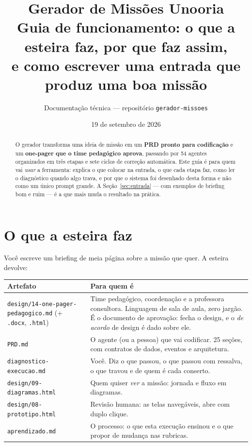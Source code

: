 \documentclass[11pt,a4paper]{article}
\title{\textbf{Gerador de Missões Unooria}\\[0.35em]
\large Guia de funcionamento: o que a esteira faz, por que faz assim,\\ e como escrever uma entrada que produz uma boa missão}
\author{Documentação técnica --- repositório \texttt{gerador-missoes}}
\date{19 de setembro de 2026}
\newcommand{\cod}[1]{\texttt{\small #1}}
\begin{document}
\maketitle

\begin{abstract}
\noindent
O gerador transforma uma ideia de missão em um \textbf{PRD pronto para codificação} e um
\textbf{one-pager que o time pedagógico aprova}, passando por 54 agentes organizados em três
etapas e sete ciclos de correção automática. Este guia é para quem vai \emph{usar} a
ferramenta: explica o que colocar na entrada, o que cada etapa faz, como ler o diagnóstico
quando algo trava, e por que o sistema foi desenhado desta forma e não como um único
prompt grande. A Seção~\ref{sec:entrada} --- com exemplos de briefing bom e ruim --- é a que
mais muda o resultado na prática.
\end{abstract}

\tableofcontents
\newpage

\section{O que a esteira faz}

Você escreve um briefing de meia página sobre a missão que quer. A esteira devolve:

\begin{table}[h]
\centering
\begin{tabular}{p{4.6cm}p{10.4cm}}
\toprule
\textbf{Artefato} & \textbf{Para quem é} \\
\midrule
\cod{design/14-one-pager-pedagogico.md} (+ \cod{.docx}, \cod{.html}) & Time pedagógico, coordenação e a professora consultora. Linguagem de sala de aula, zero jargão. É o documento de aprovação: fecha o design, e o \emph{de acordo} de design é dado sobre ele. \\
\cod{PRD.md} & O agente (ou a pessoa) que vai codificar. 25 seções, com contratos de dados, eventos e arquitetura. \\
\cod{diagnostico-execucao.md} & Você. Diz o que passou, o que passou com ressalva, o que travou e de quem é cada conserto. \\
\cod{design/09-diagramas.html} & Quem quiser \emph{ver} a missão: jornada e fluxo em diagramas. \\
\cod{design/08-prototipo.html} & Revisão humana: as telas navegáveis, abre com duplo clique. \\
\cod{aprendizado.md} & O processo: o que esta execução ensinou e o que propor de mudança nas rubricas. \\
\bottomrule
\end{tabular}
\end{table}
\end{document}
